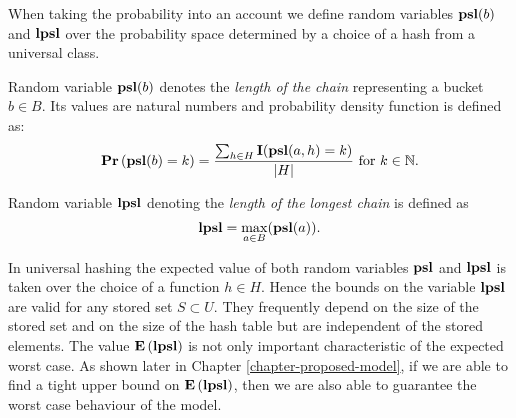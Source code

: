 When taking the probability into an account we define random variables $\mathbf{psl}(b)$ and $\mathbf{lpsl}$ over the probability space determined by a choice of a hash from a universal class.

\begin{definition}
\label{definition-lpsl}
\label{definition-psl}
Random variable $\mathbf{psl}(b)$ denotes the \emph{length of the chain} representing a bucket $b \in B$. Its values are natural numbers and probability density function is defined as:
\[
\mathbf{Pr}\left(\mathbf{psl}(b) = k\right) = \frac{\sum_{h \in H} \mathbf{I}(\mathbf{psl}(a, h) = k)}{|H|} \text{ for } k \in \mathbb{N} \text{.}
\]

Random variable $\mathbf{lpsl}$ denoting the \emph{length of the longest chain} is defined as
\[
\mathbf{lpsl} = \displaystyle\max_{a \in B}(\mathbf{psl}(a))\text{.}
\]
\end{definition}

In universal hashing the expected value of both random variables $\mathbf{psl}$ and $\mathbf{lpsl}$ is taken over the choice of a function $h \in H$. Hence the bounds on the variable $\mathbf{lpsl}$ are valid for any stored set $S \subset U$. They frequently depend on the size of the stored set and on the size of the hash table but are independent of the stored elements. The value $\mathbf{E}\left(\mathbf{lpsl}\right)$ is not only important characteristic of the expected worst case. As shown later in Chapter \ref{chapter-proposed-model}, if we are able to find a tight upper bound on $\mathbf{E}\left(\mathbf{lpsl}\right)$, then we are also able to guarantee the worst case behaviour of the model.

